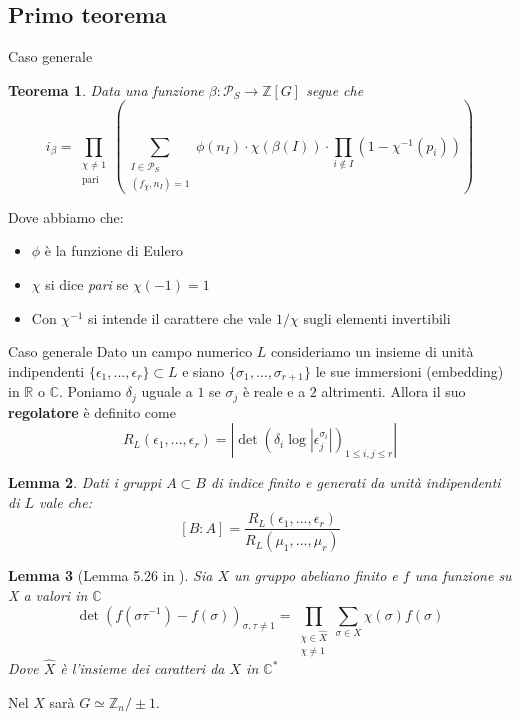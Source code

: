 \documentclass[handout]{beamer}
\theoremstyle{plain}
\newtheorem{teo}{Teorema}[section]
\newtheorem{lem}[teo]{Lemma}
\theoremstyle{remark}
\theoremstyle{definition}
\newcommand{\PS}{\mathcal{P}_S}
\newcommand{\Z}{\mathbb{Z}}
\newcommand{\C}{\mathbb{C}}
\newcommand{\R}{\mathbb{R}}
\begin{document}
\subsection{Primo teorema}
	\begin{frame}{Caso generale}
		\begin{teo}
				Data una funzione $ \beta : \PS \to \Z [G] $ segue che
					\begin{equation}
					\label{eq:idx1}
						i_\beta = \prod_{ \substack{\chi \neq 1 \\ \text{pari}}} \left( \sum_{\substack{ I \in \PS \\ (f_\chi , n_I) = 1}} \phi (n_I) \cdot \chi (\beta (I)) \cdot \prod_{i \not \in  I} (1- \chi^{-1} (p_i)) \right) 
					\end{equation}
		\end{teo}\pause
		Dove abbiamo che:
		\begin{itemize}
			\item $\phi$ è la funzione di Eulero 
			\item $\chi$ si dice \textit{pari} se $ \chi (-1) = 1 $
			\item Con $ \chi^{-1} $ si intende il carattere che vale $ 1/\chi $ sugli elementi invertibili
		\end{itemize}
	\end{frame}	
	
	\begin{frame}{Caso generale}
		Dato un campo numerico $ L $ consideriamo un insieme di unità indipendenti $ \{\epsilon_1 , ... , \epsilon_r\} \subset L$ e siano $ \{ \sigma_1 , ... , \sigma_{r+1} \} $ le sue immersioni (embedding) in $ \R $ o $ \C $. Poniamo $ \delta_j $ uguale a $ 1 $ se $ \sigma_j $ è reale e a $ 2 $ altrimenti. Allora il suo \textbf{regolatore} è definito come 
		\[ 	R_L(\epsilon_1 , ... , \epsilon_r) = | \det (\delta_i \log | \epsilon_j ^{\sigma_i}|)_{1\leq i,j\leq r} | \]
		\pause
		\begin{lem}
				\label{lem:index_reg}
				Dati i gruppi $ A \subset B $ di indice finito e generati da unità indipendenti di $ L $ vale che:
				\begin{equation} \label{eq:index_reg}
					[B:A]= \frac{R_L(\epsilon_1 , ... , \epsilon_r) }{R_L(\mu_1 , ... , \mu_r) }
				\end{equation}
			\end{lem}
	\end{frame}
	
	\begin{frame}
		\begin{lem}[Lemma 5.26 in \cite{CF}] 
			Sia $ X $ un gruppo abeliano finito e $ f $ una funzione su \textit{X} a valori in $ \C $
			\begin{equation}\label{eq:det}
				\det (f (\sigma \tau ^{-1}) - f (\sigma))_{\sigma , \tau \neq 1 } = \prod_{\substack{\chi \in \hat{X} \\ \chi \neq 1}}  \sum_{\sigma \in X} \chi(\sigma)f(\sigma)
			\end{equation}
			Dove $ \hat{X} $ è l'insieme dei caratteri da $ X $ in $ \C ^\ast $
		\end{lem}
		Nel $ X $  sarà $ G \simeq \Z_n / \pm 1 $.
	\end{frame}
	
\end{document}
